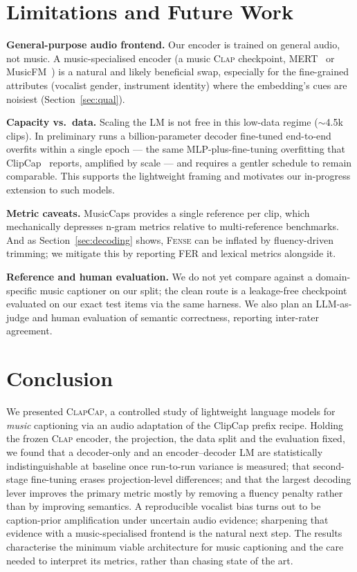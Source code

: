 \documentclass{article}
\newcommand{\fense}{\textsc{Fense}}
\newcommand{\clapenc}{\textsc{Clap}}
\newcommand{\sys}{\textsc{ClapCap}}
\begin{document}
\FloatBarrier
\section{Limitations and Future Work}\label{sec:limitations}

\textbf{General-purpose audio frontend.} Our encoder is trained on general audio, not music. A
music-specialised encoder (a music \clapenc{} checkpoint, MERT~\cite{li2024mert} or
MusicFM~\cite{won2024musicfm}) is a natural and likely beneficial swap, especially for the
fine-grained attributes (vocalist gender, instrument identity) where the embedding's cues are
noisiest (Section~\ref{sec:qual}).

\textbf{Capacity vs.\ data.} Scaling the LM is not free in this low-data regime
($\sim$4.5k clips). In preliminary runs a billion-parameter decoder fine-tuned end-to-end
overfits within a single epoch --- the same MLP-plus-fine-tuning overfitting that
ClipCap~\cite{mokady2021clipcap} reports, amplified by scale --- and requires a gentler schedule
to remain comparable. This supports the lightweight framing and motivates our in-progress
extension to such models.

\textbf{Metric caveats.} MusicCaps provides a single reference per clip, which mechanically
depresses n-gram metrics relative to multi-reference benchmarks. And as
Section~\ref{sec:decoding} shows, \fense{} can be inflated by fluency-driven trimming; we
mitigate this by reporting FER and lexical metrics alongside it.

\textbf{Reference and human evaluation.} We do not yet compare against a domain-specific music
captioner on our split; the clean route is a leakage-free checkpoint evaluated on our exact test
items via the same harness. We also plan an LLM-as-judge and human evaluation of semantic
correctness, reporting inter-rater agreement.

\section{Conclusion}\label{sec:conclusion}
We presented \sys{}, a controlled study of lightweight language models for \emph{music}
captioning via an audio adaptation of the ClipCap prefix recipe. Holding the frozen \clapenc{}
encoder, the projection, the data split and the evaluation fixed, we found that a decoder-only
and an encoder--decoder LM are statistically indistinguishable at baseline once run-to-run
variance is measured; that second-stage fine-tuning erases projection-level differences; and
that the largest decoding lever improves the primary metric mostly by removing a fluency penalty
rather than by improving semantics. A reproducible vocalist bias turns out to be
caption-prior amplification under uncertain audio evidence; sharpening that evidence with a
music-specialised frontend is the natural next step. The results characterise the minimum
viable architecture for music captioning and the care needed to interpret its metrics, rather
than chasing state of the art.
\end{document}
